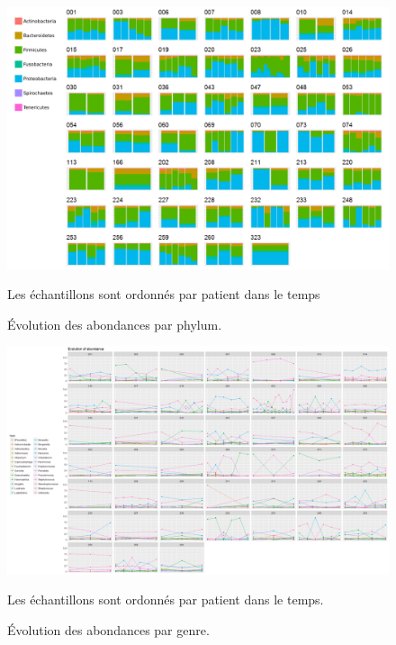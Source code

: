 \documentclass[12pt,a4paper]{article}
\begin{document}
{\begin{figure}[h]
\begin{center}
\includegraphics[width=\textwidth]{img/enfin_barplot_phylum_norm.png}\hfill
\caption{Évolution des abondances par phylum.} Les échantillons sont ordonnés par patient dans le temps

\end{center}
\label{plotabundancephylum}
\end{figure}


\begin{figure}[h]
\begin{center}
\includegraphics[scale=0.44,angle=90]{img/evolution_abundance.png}\hfill
\caption{Évolution des abondances par genre.}
Les échantillons sont ordonnés par patient dans le temps.
\end{center}

\label{plotabundancecurve}
\end{figure}


}
\end{document}
